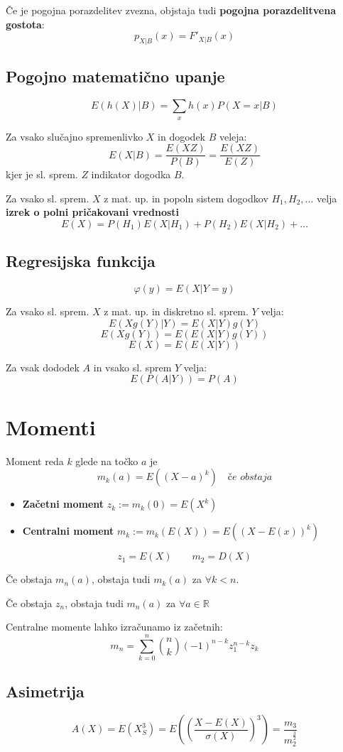 \begin{multicols}{5}
Če je pogojna porazdelitev zvezna, objstaja tudi \textbf{pogojna porazdelitvena gostota}:
\[ p_{X|B}(x) = F'_{X|B}(x)\]

\subsection{Pogojno matematično upanje}
\[ E(h(X) | B) = \sum_x h(x) P(X = x | B)\]

Za vsako slučajno spremenlivko $X$ in dogodek $B$ veleja:
\[ E(X |B) = \frac{E(XZ)}{P(B)} = \frac{E(XZ)}{E(Z)}\]
kjer je sl. sprem. $Z$ indikator dogodka $B$.

Za vsako sl. sprem. $X$ z mat. up. in popoln sistem dogodkov $H_1, H_2, \dots$ velja \textbf{izrek o polni pričakovani vrednosti}
\[E(X) = P(H_1)E(X | H_1) + P(H_2)E(X | H_2)+\dots \]

\subsection{Regresijska funkcija}
\[ \varphi(y) = E(X | Y = y) \]

Za vsako sl. sprem. $X$ z mat. up. in diskretno sl. sprem. $Y$ velja:
\[ E(Xg(Y) | Y) = E(X | Y)g(Y) \]
\[ E(Xg(Y)) = E(E(X | Y)g(Y)) \]
\[ E(X) = E(E(X|Y))\]

Za vsak dododek $A$ in vsako sl. sprem $Y$ velja:
\[ E(P(A|Y)) = P(A)\]


\section{Momenti}
Moment reda $k$ glede na točko $a$ je
\[ m_k(a) = E((X-a)^k) \quad \textit{če obstaja}\]

\begin{itemize}
	\item \textbf{Začetni moment} $z_k := m_k(0) = E(X^k)$
	\item \textbf{Centralni moment} $m_k := m_k(E(X)) = E((X-E(x))^k)$
\end{itemize}

\[ z_1 = E(X) \qquad m_2 = D(X)\]

Če obstaja $m_n(a)$, obstaja tudi $m_k(a)$ za $\forall k < n$.

Če obstaja $z_n$, obstaja tudi $m_n(a)$ za $\forall a \in \mathbb{R}$

Centralne momente lahko izračunamo iz začetnih:
\[ m_n = \sum_{k=0}^n \binom{n}{k} (-1)^{n-k} z_1^{n-k} z_k \]

\subsection{Asimetrija}
\[A(X) = E(X_S^3) = E\left( (\frac{X-E(X)}{\sigma(X)})^3 \right) = \frac{m_3}{m_2^{\frac{3}{2}}}\]


\end{multicols}
